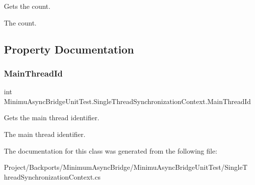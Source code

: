 Gets the count. 

The count.

\subsection{Property Documentation}
\mbox{\label{class_minimu_async_bridge_unit_test_1_1_single_thread_synchronization_context_aaa40e78add3ae26af39fdcc129f20344}} 
\subsubsection{\texorpdfstring{Main\+Thread\+Id}{MainThreadId}}
{\footnotesize\ttfamily int Minimu\+Async\+Bridge\+Unit\+Test.\+Single\+Thread\+Synchronization\+Context.\+Main\+Thread\+Id\hspace{0.3cm}{\ttfamily [get]}}



Gets the main thread identifier. 

The main thread identifier.

The documentation for this class was generated from the following file\+:\begin{DoxyCompactItemize}
\item 
Project/\+Backports/\+Minimum\+Async\+Bridge/\+Minimu\+Async\+Bridge\+Unit\+Test/Single\+Thread\+Synchronization\+Context.\+cs\end{DoxyCompactItemize}

